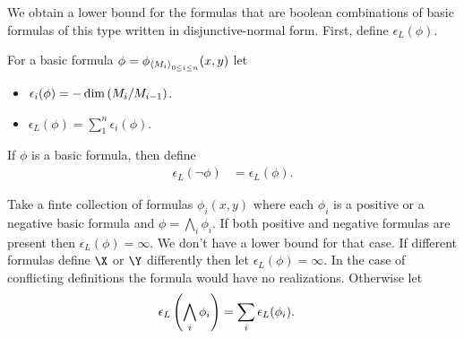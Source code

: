 \documentclass{amsart}
\begin{document}
We obtain a lower bound for the formulas that are boolean combinations of basic formulas of this type written in disjunctive-normal form.
First, define $\epsilon_L(\phi)$.


\begin{Definition} 
  For a basic formula $\phi = \phi_{\left\langle M_i \right\rangle_{0 \leq i \leq n}}(x, y)$ let
  \begin{itemize}
  \item $\epsilon_i(\phi) = -\dim \left(M_i/M_{i-1}\right)$.
  \item $\epsilon_L(\phi) = \sum_1^{n} \epsilon_i(\phi)$.
  \end{itemize}
\end{Definition}

\begin{Definition}[Negation]
  If $\phi$ is a basic formula, then define
  \begin{align*}
    \epsilon_L(\neg \phi) &= \epsilon_L(\phi).
  \end{align*}
\end{Definition}

\begin{Definition}[Conjunction]
  Take a finte collection of formulas $\phi_i(x, y)$ where each $\phi_i$ is a positive or a negative basic formula
  and $\phi = \bigwedge_i\phi_i$.
  If both positive and negative formulas are present then $\epsilon_L(\phi) = \infty$.
  We don't have a lower bound for that case.
  If different formulas define $\X$ or $\Y$ differently then let $\epsilon_L(\phi) = \infty$.
  In the case of conflicting definitions the formula would have no realizations.
  Otherwise let
  \begin{align*}
    \epsilon_L\left(\bigwedge_i \phi_i\right) &= \sum_i \epsilon_L(\phi_i).
  \end{align*}
\end{Definition}
\end{document}

